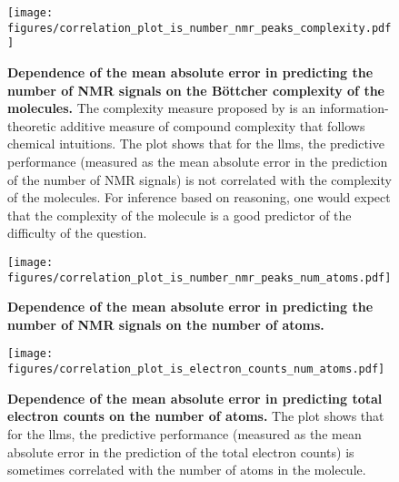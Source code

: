 \begin{figure}[!h]
    \centering
    \texttt{[image: figures/correlation\_plot\_is\_number\_nmr\_peaks\_complexity.pdf]}
    \caption{\textbf{Dependence of the mean absolute error in predicting the number of NMR signals on the Böttcher complexity of the molecules.} The complexity measure proposed by \textcite{B_ttcher_2016} is an information-theoretic additive measure of compound complexity that follows chemical intuitions.
    The plot shows that for the \glspl{llm}, the predictive performance (measured as the mean absolute error in the prediction of the number of NMR signals) is not correlated with the complexity of the molecules. For inference based on reasoning, one would expect that the complexity of the molecule is a good predictor of the difficulty of the question.}
    \label{fig:correlation_plot_is_number_nmr_peaks_complexity}
\end{figure}

\begin{figure}[!h]
    \centering
    \texttt{[image: figures/correlation\_plot\_is\_number\_nmr\_peaks\_num\_atoms.pdf]}
    \caption{\textbf{Dependence of the mean absolute error in predicting the number of NMR signals on the number of atoms.} }
    \label{fig:correlation_plot_is_number_nmr_peaks_num_atoms}
\end{figure}


\begin{figure}[!h]
    \centering
    \texttt{[image: figures/correlation\_plot\_is\_electron\_counts\_num\_atoms.pdf]}
    \caption{\textbf{Dependence of the mean absolute error in predicting total electron counts on the number of atoms.} The plot shows that for the \glspl{llm}, the predictive performance (measured as the mean absolute error in the prediction of the total electron counts) is sometimes correlated with the number of atoms in the molecule.}
    \label{fig:correlation_plot_is_electron_counts_num_atoms}
\end{figure}

